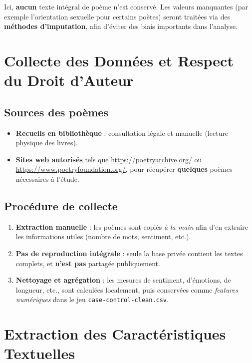 \documentclass[12pt,a4paper]{article}
\begin{document}
	Ici, \textbf{aucun} texte intégral de poème n’est conservé. Les valeurs 
	manquantes (par exemple l’orientation sexuelle pour certains poètes) 
	seront traitées via des \textbf{méthodes d’imputation}, afin d’éviter 
	des biais importants dans l’analyse.
	
	\section{Collecte des Données et Respect du Droit d'Auteur}
	\label{sec:data_collection}
	
	\subsection{Sources des poèmes}
	\begin{itemize}
		\item \textbf{Recueils en bibliothèque} : consultation légale et manuelle 
		(lecture physique des livres).
		\item \textbf{Sites web autorisés} tels que \url{https://poetryarchive.org/} 
		ou \url{https://www.poetryfoundation.org/}, pour récupérer \textbf{quelques} 
		poèmes nécessaires à l’étude.
	\end{itemize}
	
	\subsection{Procédure de collecte}
	\begin{enumerate}
		\item \textbf{Extraction manuelle} : les poèmes sont copiés \textit{à la main} 
		afin d’en extraire les informations utiles (nombre de mots, sentiment, etc.).
		\item \textbf{Pas de reproduction intégrale} : seule la base privée contient 
		les textes complets, et \textbf{n’est pas} partagée publiquement.
		\item \textbf{Nettoyage et agrégation} : les mesures de sentiment, d’émotions, 
		de longueur, etc., sont calculées localement, puis conservées comme 
		\textit{features numériques} dans le jeu \texttt{case-control-clean.csv}.
	\end{enumerate}
	
	\section{Extraction des Caractéristiques Textuelles}
	\label{sec:text_features}
	
\end{document}
